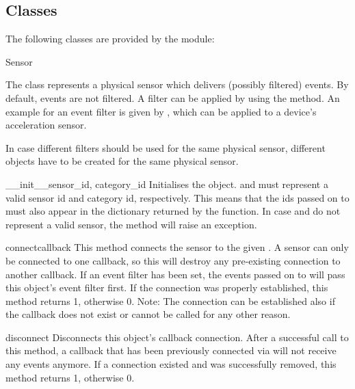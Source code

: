 \subsection{Classes}
\label{subsec:sensorclasses}
The following classes are provided by the  module:

\begin{classdesc*}{Sensor}

The  class represents a physical sensor which delivers (possibly filtered) events.
By default, events are not filtered. A filter can be applied by using the 
method. An example for an event filter is given by , which can
be applied to a device's acceleration sensor.

In case different filters should be used for the same physical sensor, different 
objects have to be created for the same physical sensor.

\begin{methoddesc}[Sensor]{__init__}{sensor_id, category_id}
Initialises the  object.  and 
must represent a valid sensor id and category id, respectively. This means that
the ids passed on to  must also appear in the dictionary returned by
the  function.
In case  and  do not represent a valid sensor,
the  method will raise an exception.
\end{methoddesc}

\begin{methoddesc}[Sensor]{connect}{callback}
This method connects the sensor to the given . A sensor can only be connected
to one callback, so this will destroy any pre-existing connection to another callback.
If an event filter has been set, the events passed on to  will pass
this  object's event filter first.
If the connection was properly established, this method returns 1, otherwise 0.
Note: The connection can be established also if the callback does not exist or cannot be
called for any other reason.
\end{methoddesc}

\begin{methoddesc}[Sensor]{disconnect}{}
Disconnects this  object's callback connection. After a successful call
to this method, a callback that has been previously connected via  will
not receive any events anymore.
If a connection existed and was successfully removed, this method returns 1, otherwise 0.
\end{methoddesc}


\end{classdesc*}

